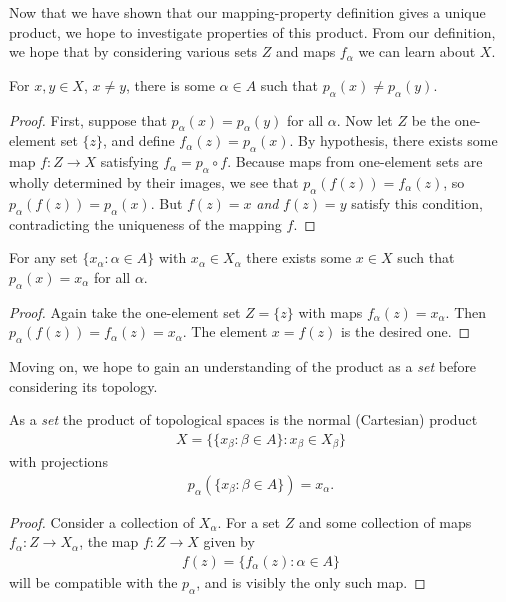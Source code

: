       Now that we have shown that our mapping-property definition gives a unique product, we hope to investigate properties of this product.
      From our definition, we hope that by considering various sets $Z$ and maps $f_\alpha$ we can learn about $X$.
      \begin{claim}
        For $x,y\in X$, $x\ne y$, there is some $\alpha\in A$ such that $p_\alpha(x)\ne p_\alpha(y)$.
        \begin{proof}
          First, suppose that $p_\alpha(x)=p_\alpha(y)$ for all $\alpha$.
          Now let $Z$ be the one-element set $\{z\}$, and define $f_\alpha(z)=p_\alpha(x)$.
          By hypothesis, there exists some map $f:Z\rightarrow X$ satisfying $f_\alpha = p_\alpha \circ f$.
          Because maps from one-element sets are wholly determined by their images, we see that $p_\alpha(f(z))=f_\alpha(z)$, so $p_\alpha(f(z))=p_\alpha(x)$.
          But $f(z)=x$ \emph{and} $f(z)=y$ satisfy this condition, contradicting the uniqueness of the mapping $f$.
        \end{proof}
      \end{claim}

      \begin{claim}
        For any set $\{x_\alpha:\alpha\in A\}$ with $x_\alpha\in X_\alpha$ there exists some $x\in X$ such that $p_\alpha(x)=x_\alpha$ for all $\alpha$.
        \begin{proof}
          Again take the one-element set $Z=\{z\}$ with maps $f_\alpha(z)=x_\alpha$.
          Then $p_\alpha(f(z))=f_\alpha(z)=x_\alpha$.
          The element $x=f(z)$ is the desired one.
        \end{proof}
      \end{claim}
      
      Moving on, we hope to gain an understanding of the product as a \emph{set} before considering its topology.
      \begin{claim}
        As a \emph{set} the product of topological spaces is the normal (Cartesian) product
        \begin{align*}
          X = \{\{x_\beta:\beta\in A\}: x_\beta\in X_\beta\}
        \end{align*}
        with projections
        \begin{align*}
          p_\alpha(\{x_\beta:\beta\in A\}) = x_\alpha\text{.}
        \end{align*}
        \begin{proof}
          Consider a collection of $X_\alpha$.
          For a set $Z$ and some collection of maps $f_\alpha:Z\rightarrow X_\alpha$, the map $f:Z\rightarrow X$ given by
          \begin{align*}
            f(z) = \{f_\alpha(z):\alpha\in A\}
          \end{align*}
          will be compatible with the $p_\alpha$, and is visibly the only such map.
        \end{proof}
      \end{claim}

